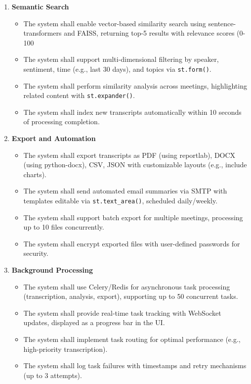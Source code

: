 \documentclass[12pt]{article}
\begin{document}
\begin{enumerate}
\begin{itemize}
    \end{itemize}
    \item \textbf{Semantic Search}
    \begin{itemize}
        \item The system shall enable vector-based similarity search using sentence-transformers and FAISS, returning top-5 results with relevance scores (0-100%
        \item The system shall support multi-dimensional filtering by speaker, sentiment, time (e.g., last 30 days), and topics via \texttt{st.form()}.
        \item The system shall perform similarity analysis across meetings, highlighting related content with \texttt{st.expander()}.
        \item The system shall index new transcripts automatically within 10 seconds of processing completion.
    \end{itemize}
    \item \textbf{Export and Automation}
    \begin{itemize}
        \item The system shall export transcripts as PDF (using reportlab), DOCX (using python-docx), CSV, JSON with customizable layouts (e.g., include charts).
        \item The system shall send automated email summaries via SMTP with templates editable via \texttt{st.text_area()}, scheduled daily/weekly.
        \item The system shall support batch export for multiple meetings, processing up to 10 files concurrently.
        \item The system shall encrypt exported files with user-defined passwords for security.
    \end{itemize}
    \item \textbf{Background Processing}
    \begin{itemize}
        \item The system shall use Celery/Redis for asynchronous task processing (transcription, analysis, export), supporting up to 50 concurrent tasks.
        \item The system shall provide real-time task tracking with WebSocket updates, displayed as a progress bar in the UI.
        \item The system shall implement task routing for optimal performance (e.g., high-priority transcription).
        \item The system shall log task failures with timestamps and retry mechanisms (up to 3 attempts).

\end{itemize}
\end{enumerate}
\end{document}
